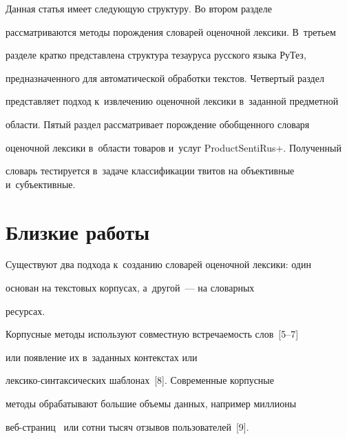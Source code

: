      Данная статья имеет следующую структуру. Во втором разделе


рассматриваются методы порождения словарей оценочной лексики. В~третьем


разделе кратко представлена структура тезауруса русского языка РуТез,


предназначенного для автоматической обработки текстов. Четвертый раздел


представляет подход к~извлечению оценочной лексики в~заданной предметной


области. Пятый раздел рассматривает порождение обобщенного словаря


оценочной лексики в~области товаров и~услуг ProductSentiRus+. Полученный


словарь тестируется в~задаче классификации твитов на объективные и~субъективные.





\vspace*{-6pt}





\section{Близкие работы}





\vspace*{-1pt}





     Существуют два подхода к~созданию словарей оценочной лексики: один


основан на текстовых корпусах, а~другой~--- на словарных


ресурсах.








     Корпусные методы используют совместную встречаемость слов~[5--7]


или появление их в~заданных контекстах или


     лек\-си\-ко-син\-так\-си\-че\-ских шаблонах~[8]. Современные корпусные


методы обрабатывают большие объемы данных, например миллионы


     веб-стра\-ниц~\cite{6-luk} или сотни тысяч отзывов пользователей~[9].





